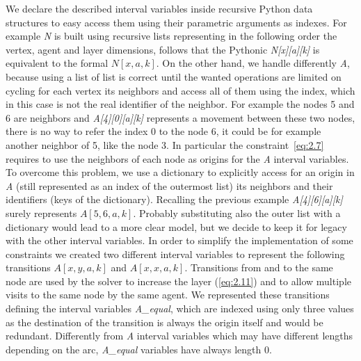 \documentclass[12pt, a4paper, hidelinks]{article}
\numberwithin{equation}{section}
\begin{document}
We declare the described interval variables inside recursive Python data structures to easy access them using their parametric arguments as indexes.
For example \textit{N} is built using recursive lists representing in the following order the vertex, agent and layer dimensions, follows that the Pythonic \textit{N[x][a][k]} is equivalent to the formal $N[x,a,k]$.
On the other hand, we handle differently \textit{A}, because using a list of list is correct until the wanted operations are limited on cycling for each vertex its neighbors and access all of them using the index, which in this case is not the real identifier of the neighbor.
For example the nodes 5 and 6 are neighbors and \textit{A[4][0][a][k]} represents a movement between these two nodes, there is no way to refer the index 0 to the node 6, it could be for example another neighbor of 5, like the node 3.
In particular the constraint~\ref{eq:2.7} requires to use the neighbors of each node as origins for the \textit{A} interval variables.
To overcome this problem, we use a dictionary to explicitly access for an origin in \textit{A} (still represented as an index of the outermost list) its neighbors and their identifiers (keys of the dictionary).
Recalling the previous example \textit{A[4][6][a][k]} surely represents $A[5,6,a,k]$.
Probably substituting also the outer list with a dictionary would lead to a more clear model, but we decide to keep it for legacy with the other interval variables.
In order to simplify the implementation of some constraints we created two different interval variables to represent the following transitions $A[x,y,a,k]$ and $A[x,x,a,k]$.
Transitions from and to the same node are used by the solver to increase the layer (\ref{eq:2.11}) and to allow multiple visits to the same node by the same agent.
We represented these transitions defining the interval variables \textit{A\_equal}, which are indexed using only three values as the destination of the transition is always the origin itself and would be redundant.
Differently from \textit{A} interval variables which may have different lengths depending on the arc, \textit{A\_equal} variables have always length 0.
\end{document}

